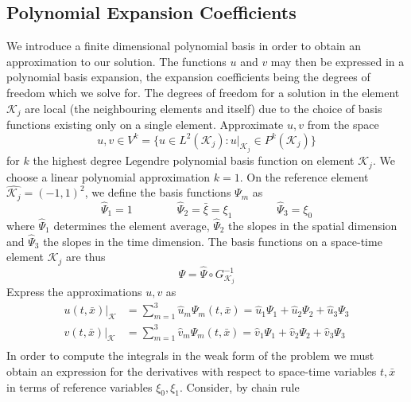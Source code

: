 \documentclass[11pt, oneside]{article}   	%
\begin{document}
\subsection{Polynomial Expansion Coefficients}
We introduce a finite dimensional polynomial basis in order to obtain an approximation to our solution.
The functions $u$ and $v$ may then be expressed in a polynomial basis expansion, the expansion coefficients being the degrees of freedom which we solve for.
The degrees of freedom for a solution in the element $\mathcal{K}_j$ are local (the neighbouring elements and itself) due to the choice of basis functions existing only on a single element.
Approximate $u,v$ from the space
\[ u,v \in V^k = \{u \in L^2(\mathcal{K}_j) : u|_{\mathcal{K}_j} \in P^k(\mathcal{K}_j) \} \]
for $k$ the highest degree Legendre polynomial basis function on element $\mathcal{K}_j$.
We choose a linear polynomial approximation $k=1$.
On the reference element $\hat{\mathcal{K}_j} = (-1,1)^2$, we define the basis functions $\Psi_m$ as
\[ \hat{\Psi}_1 = 1 \qquad\qquad \hat{\Psi}_2 = \bar{\xi} = \xi_1 \qquad\qquad \hat{\Psi}_3 = \xi_0 \]
where $\hat{\Psi}_1$ determines the element average, $\hat{\Psi}_2$ the slopes in the spatial dimension and $\hat{\Psi}_3$ the slopes in the time dimension.
The basis functions on a space-time element $\mathcal{K}_j$ are thus 
\[ \Psi = \hat{\Psi} \circ G_{\mathcal{K}_j}^{-1} \]
Express the approximations $u,v$ as
\begin{equation}\label{poly_expan}
\begin{split}
u(t,\bar{x})|_{\mathcal{K}} &= \sum_{m=1}^3 \hat{u}_m \Psi_m(t,\bar{x}) = \hat{u}_1 \Psi_1 + \hat{u}_2 \Psi_2 + \hat{u}_3 \Psi_3\\
v(t,\bar{x})|_{\mathcal{K}} &= \sum_{m=1}^3 \hat{v}_m \Psi_m(t,\bar{x}) = \hat{v}_1 \Psi_1 + \hat{v}_2 \Psi_2 + \hat{v}_3 \Psi_3\\
\end{split}
\end{equation}
In order to compute the integrals in the weak form of the problem we must obtain an expression for the derivatives with respect to space-time variables $t,\bar{x}$ in terms of reference variables $\xi_0,\xi_1$.
Consider, by chain rule
\end{document}
